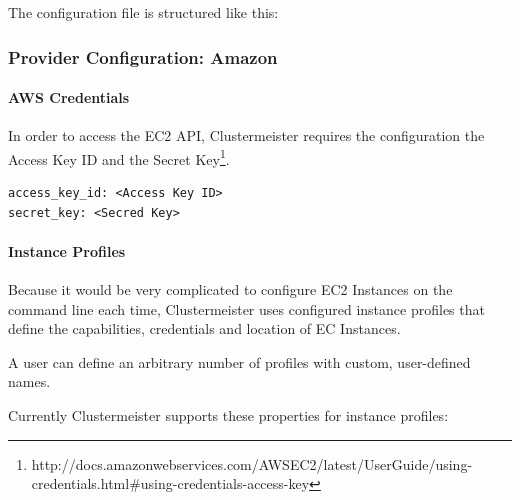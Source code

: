 \documentclass{article}
\begin{document}
The configuration file is structured like this:



\subsubsection{Provider Configuration: Amazon}

\paragraph{AWS Credentials}

In order to access the EC2 API, Clustermeister requires the configuration the Access Key ID and the Secret Key\footnote{http://docs.amazonwebservices.com/AWSEC2/latest/UserGuide/using-credentials.html\#using-credentials-access-key}.

\begin{lstlisting}[breaklines=true, frame=single]
access_key_id: <Access Key ID> 
secret_key: <Secred Key>
\end{lstlisting}

\paragraph{Instance Profiles}

Because it would be very complicated to configure EC2 Instances on the command line each time, Clustermeister uses configured instance profiles that define the capabilities, credentials and location of EC Instances.

A user can define an arbitrary number of profiles with custom, user-defined names.

Currently Clustermeister supports these properties for instance profiles:
\end{document}
